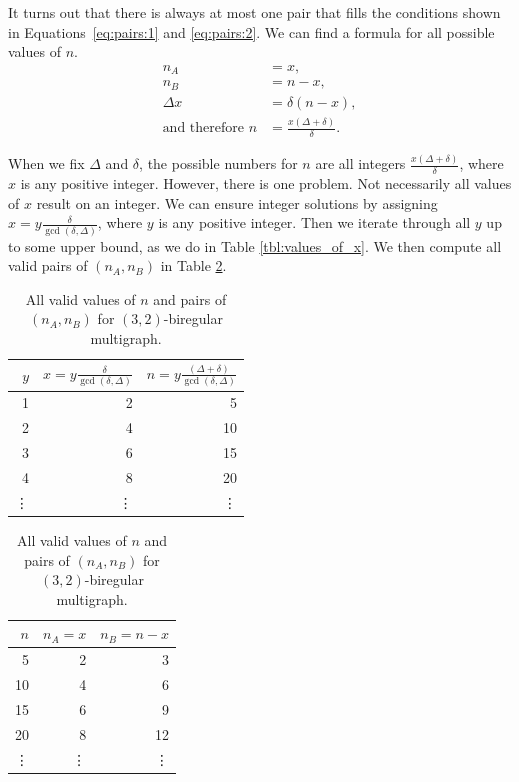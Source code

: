 It turns out that there is always at most one pair that fills the conditions shown in Equations~\ref{eq:pairs:1} and \ref{eq:pairs:2}.
We can find a formula for all possible values of $n$.
\begin{align*}
  n_A &= x, \\
  n_B &= n-x,\\
  \Delta x &= \delta (n-x), \\
  \text{and therefore } n&=\frac{x(\Delta+\delta)}{\delta}.
\end{align*}

When we fix $\Delta$ and $\delta$, the possible numbers for $n$ are all integers $\frac{x(\Delta + \delta)}{\delta}$, where $x$ is any positive integer.
However, there is one problem.
Not necessarily all values of $x$ result on an integer.
We can ensure integer solutions by assigning $x=y\frac{\delta}{\gcd(\delta, \Delta)}$, where $y$ is any positive integer.
Then we iterate through all $y$ up to some upper bound, as we do in Table \ref{tbl:values_of_x}.
We then compute all valid pairs of $(n_A, n_B)$ in Table \ref{tbl:valid_pairs}.

\begin{table}[H]
  \parbox{.45\linewidth}{
  \centering
  \begin{tabular}{rrr}
    \toprule
    $y$&$x=y\frac{\delta}{\gcd(\delta, \Delta)}$&$n=y\frac{(\Delta + \delta)}{\gcd(\delta, \Delta)}$\\
    \midrule
    1 & 2 & 5 \\
    2 & 4 & 10 \\
    3 & 6 & 15 \\
    4 & 8 & 20 \\
    \vdots & \vdots & \vdots \\
    \bottomrule
  \end{tabular}
  \caption{
    All values of $y$, $x$, and $n$ for $(3,2)$-biregular multigraph.
  }
  \label{tbl:values_of_x}
  }
  \hfill
  \parbox{.45\linewidth}{
  \centering
  \begin{tabular}{rrr}
    \toprule
    $n$&$n_A=x$&$n_B=n-x$\\
    \midrule
    5 & 2 & 3   \\
    10 & 4 & 6  \\
    15 & 6 & 9  \\
    20 & 8 & 12 \\
    \vdots & \vdots & \vdots\\
    \bottomrule
  \end{tabular}
  \caption{
    All valid values of $n$ and pairs of $(n_A, n_B)$ for $(3,2)$-biregular multigraph.
  }
  \label{tbl:valid_pairs}
  }
\end{table}

